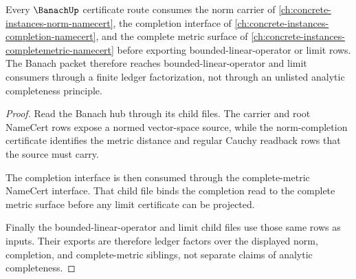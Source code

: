 \begin{theorem}
\label{thm:banach-complete-metric-norm-sibling-route}
Every $\BanachUp$ certificate route consumes the norm carrier of \autoref{ch:concrete-instances-norm-namecert}, the completion interface of \autoref{ch:concrete-instances-completion-namecert}, and the complete metric surface of \autoref{ch:concrete-instances-completemetric-namecert} before exporting bounded-linear-operator or limit rows. The Banach packet therefore reaches bounded-linear-operator and limit consumers through a finite ledger factorization, not through an unlisted analytic completeness principle.
\end{theorem}
\begin{proof}
Read the Banach hub through its child files. The carrier and root NameCert rows expose a normed vector-space source, while the norm-completion certificate identifies the metric distance and regular Cauchy readback rows that the source must carry.

The completion interface is then consumed through the complete-metric NameCert interface. That child file binds the completion read to the complete metric surface before any limit certificate can be projected.

Finally the bounded-linear-operator and limit child files use those same rows as inputs. Their exports are therefore ledger factors over the displayed norm, completion, and complete-metric siblings, not separate claims of analytic completeness.
\end{proof}

